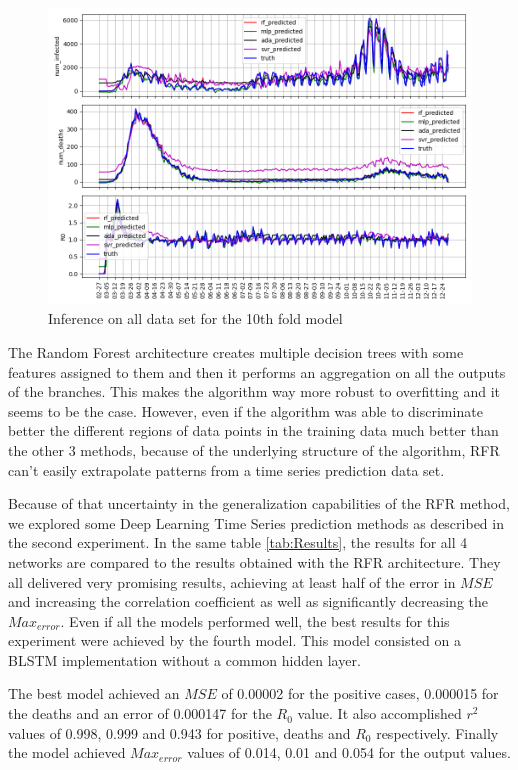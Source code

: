 \documentclass[anon]{CI}
\begin{document}
\begin{figure}[!ht]
    \center
    \includegraphics[width=\linewidth]{allpredictions}
    \caption{\label{fig:allpredictions}Inference on all data set for the 10th fold model}
\end{figure}

The Random Forest architecture creates multiple decision trees with some features assigned to them and then it performs an aggregation on all the outputs of the branches. This makes the algorithm way more robust to overfitting and it seems to be the case. However, even if the algorithm was able to discriminate better the different regions of data points in the training data much better than the other 3 methods, because of the underlying structure of the algorithm, RFR can't easily extrapolate patterns from a time series prediction data set. 

Because of that uncertainty in the generalization capabilities of the RFR method, we explored some Deep Learning Time Series prediction methods as described in the second experiment. In the same table \ref{tab:Results}, the results for all 4 networks are compared to the results obtained with the RFR architecture. They all delivered very promising results, achieving at least half of the error in $MSE$ and increasing the correlation coefficient as well as significantly decreasing the $Max_{error}$. Even if all the models performed well, the best results for this experiment were achieved by the fourth model. This model consisted on a BLSTM implementation without a common hidden layer. 

The best model achieved an $MSE$ of 0.00002 for the positive cases, 0.000015 for the deaths and an error of 0.000147 for the $R_0$ value. It also accomplished $r^2$ values of 0.998, 0.999 and 0.943 for positive, deaths and $R_0$ respectively. Finally the model achieved $Max_{error}$ values of 0.014, 0.01 and 0.054 for the output values.
\end{document}
